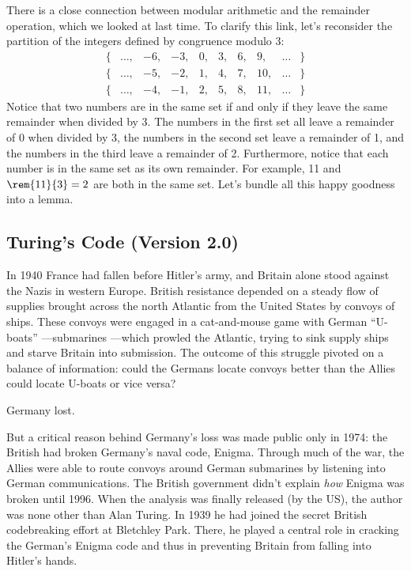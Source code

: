 There is a close connection between modular arithmetic and the
remainder operation, which we looked at last time.  To clarify this
link, let's reconsider the partition of the integers defined by
congruence modulo 3:
%
\[
\begin{array}{cccccccccc}
\{ & \dots, & -6, & -3, & 0, & 3, & 6, & 9, & \dots & \} \\
\{ & \dots, & -5, & -2, & 1, & 4, & 7, & 10, & \dots & \} \\
\{ & \dots, & -4, & -1, & 2, & 5, & 8, & 11, & \dots & \}
\end{array}
\]
%
Notice that two numbers are in the same set if and only if they leave
the same remainder when divided by 3.  The numbers in the first set
all leave a remainder of 0 when divided by 3, the numbers in the
second set leave a remainder of 1, and the numbers in the third leave
a remainder of 2.  Furthermore, notice that each number is in the same
set as its own remainder.  For example, 11 and $\rem{11}{3} = 2$ are
both in the same set.  Let's bundle all this happy goodness into a
lemma.
\fi


\subsection{Turing's Code (Version 2.0)}

In 1940 France had fallen before Hitler's army, and Britain alone stood
against the Nazis in western Europe.  British resistance depended on a
steady flow of supplies brought across the north Atlantic from the United
States by convoys of ships.  These convoys were engaged in a cat-and-mouse
game with German ``U-boats'' ---submarines ---which prowled the Atlantic,
trying to sink supply ships and starve Britain into submission.  The
outcome of this struggle pivoted on a balance of information: could the
Germans locate convoys better than the Allies could locate U-boats or vice
versa?

Germany lost.

But a critical reason behind Germany's loss was made public only in
1974: the British had broken Germany's naval code, Enigma.  Through
much of the war, the Allies were able to route convoys around German
submarines by listening into German communications.  The British
government didn't explain \emph{how} Enigma was broken until 1996.
When the analysis was finally released (by the US), the author was
none other than Alan Turing.  In 1939 he had joined the secret British
codebreaking effort at Bletchley Park.  There, he played a central
role in cracking the German's Enigma code and thus in preventing
Britain from falling into Hitler's hands.

